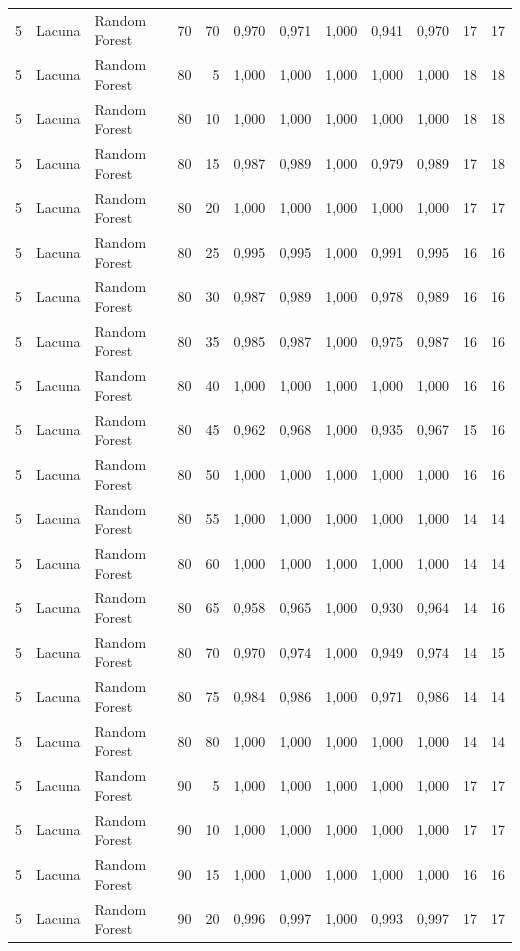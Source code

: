 \begin{longtable}{@{}rllrrrrrrrrr@{}}
5 & Lacuna & Random Forest & 70 & 70 & 0,970 & 0,971 & 1,000 & 0,941 & 0,970 & 17 & 17 \\
5 & Lacuna & Random Forest & 80 & 5 & 1,000 & 1,000 & 1,000 & 1,000 & 1,000 & 18 & 18 \\
5 & Lacuna & Random Forest & 80 & 10 & 1,000 & 1,000 & 1,000 & 1,000 & 1,000 & 18 & 18 \\
5 & Lacuna & Random Forest & 80 & 15 & 0,987 & 0,989 & 1,000 & 0,979 & 0,989 & 17 & 18 \\
5 & Lacuna & Random Forest & 80 & 20 & 1,000 & 1,000 & 1,000 & 1,000 & 1,000 & 17 & 17 \\
5 & Lacuna & Random Forest & 80 & 25 & 0,995 & 0,995 & 1,000 & 0,991 & 0,995 & 16 & 16 \\
5 & Lacuna & Random Forest & 80 & 30 & 0,987 & 0,989 & 1,000 & 0,978 & 0,989 & 16 & 16 \\
5 & Lacuna & Random Forest & 80 & 35 & 0,985 & 0,987 & 1,000 & 0,975 & 0,987 & 16 & 16 \\
5 & Lacuna & Random Forest & 80 & 40 & 1,000 & 1,000 & 1,000 & 1,000 & 1,000 & 16 & 16 \\
5 & Lacuna & Random Forest & 80 & 45 & 0,962 & 0,968 & 1,000 & 0,935 & 0,967 & 15 & 16 \\
5 & Lacuna & Random Forest & 80 & 50 & 1,000 & 1,000 & 1,000 & 1,000 & 1,000 & 16 & 16 \\
5 & Lacuna & Random Forest & 80 & 55 & 1,000 & 1,000 & 1,000 & 1,000 & 1,000 & 14 & 14 \\
5 & Lacuna & Random Forest & 80 & 60 & 1,000 & 1,000 & 1,000 & 1,000 & 1,000 & 14 & 14 \\
5 & Lacuna & Random Forest & 80 & 65 & 0,958 & 0,965 & 1,000 & 0,930 & 0,964 & 14 & 16 \\
5 & Lacuna & Random Forest & 80 & 70 & 0,970 & 0,974 & 1,000 & 0,949 & 0,974 & 14 & 15 \\
5 & Lacuna & Random Forest & 80 & 75 & 0,984 & 0,986 & 1,000 & 0,971 & 0,986 & 14 & 14 \\
5 & Lacuna & Random Forest & 80 & 80 & 1,000 & 1,000 & 1,000 & 1,000 & 1,000 & 14 & 14 \\
5 & Lacuna & Random Forest & 90 & 5 & 1,000 & 1,000 & 1,000 & 1,000 & 1,000 & 17 & 17 \\
5 & Lacuna & Random Forest & 90 & 10 & 1,000 & 1,000 & 1,000 & 1,000 & 1,000 & 17 & 17 \\
5 & Lacuna & Random Forest & 90 & 15 & 1,000 & 1,000 & 1,000 & 1,000 & 1,000 & 16 & 16 \\
5 & Lacuna & Random Forest & 90 & 20 & 0,996 & 0,997 & 1,000 & 0,993 & 0,997 & 17 & 17 \\

\end{longtable}
